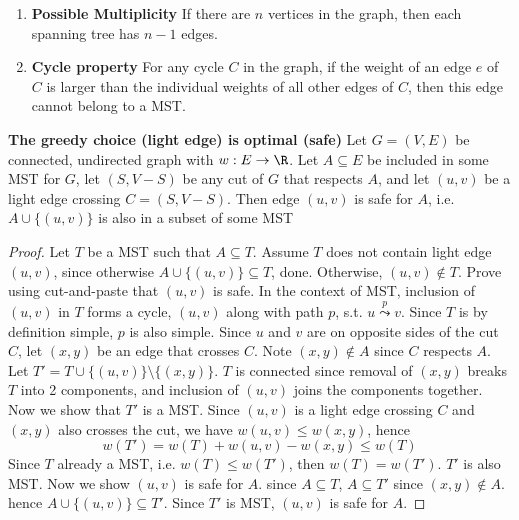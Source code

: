 \documentclass[11pt]{article}
\begin{document}
\begin{proposition*}
    \begin{enumerate}
        \item \textbf{Possible Multiplicity} If there are $n$ vertices in the graph, then each spanning tree has $n − 1$ edges.
        \item \textbf{Cycle property} For any cycle $C$ in the graph, if the weight of an edge $e$ of $C$ is larger than the individual weights of all other edges of $C$, then this edge cannot belong to a MST.
    \end{enumerate}
\end{proposition*}


\begin{theorem*}
    \textbf{The greedy choice (light edge) is optimal (safe)} Let $G = (V,E)$ be connected, undirected graph with $w:E\to \R$. Let $A\subseteq E$ be included in some MST for $G$, let $(S,V-S)$ be any cut of $G$ that respects $A$, and let $(u,v)$ be a light edge crossing $C = (S,V-S)$. Then edge $(u,v)$ is safe for $A$, i.e. $A \cup \{(u,v) \}$ is also in a subset of some MST
    \begin{proof}
        Let $T$ be a MST such that $A\subseteq T$. Assume $T$ does not contain light edge $(u,v)$, since otherwise $A \cup \{(u,v) \} \subseteq T$, done. Otherwise, $(u,v) \not\in T$. Prove using cut-and-paste that $(u,v)$ is safe. In the context of MST, inclusion of $(u,v)$ in $T$ forms a cycle, $(u,v)$ along with path $p$, s.t. $u \overset{p}{\leadsto} v$. Since $T$ is by definition simple, $p$ is also simple. Since $u$ and $v$ are on opposite sides of the cut $C$, let $(x,y)$ be an edge that crosses $C$. Note $(x,y) \not\in A$ since $C$ respects $A$. Let $T' = T \cup \{(u,v) \} \setminus \{ (x,y) \}$. $T$ is connected since removal of $(x,y)$ breaks $T$ into 2 components, and inclusion of $(u,v)$ joins the components together. Now we show that $T'$ is a MST. Since $(u,v)$ is a light edge crossing $C$ and $(x,y)$ also crosses the cut, we have $w(u,v) \leq w(x,y)$, hence 
        \[
            w(T') = w(T) + w(u,v) - w(x,y) \leq w(T)
        \]
        Since $T$ already a MST, i.e. $w(T) \leq w(T')$, then $w(T) = w(T')$. $T'$ is also MST. Now we show $(u,v)$ is safe for $A$. since $A\subseteq T$, $A\subseteq T'$ since $(x,y) \not\in A$. hence $A \cup \{ (u,v)\} \subseteq T'$. Since $T'$ is MST, $(u,v)$ is safe for $A$.
    \end{proof}
\end{theorem*}
\end{document}
